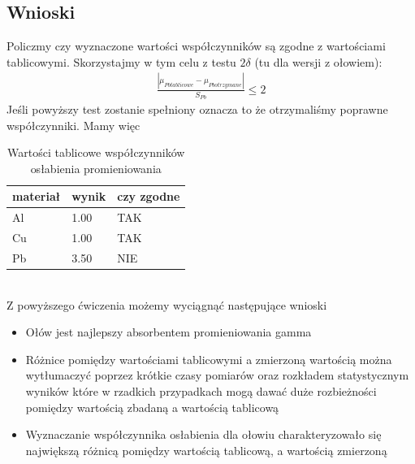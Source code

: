 \documentclass[a4paper]{article}
\newlength{\du}
\begin{document}
\subsection{Wnioski}
Policzmy czy wyznaczone wartości współczynników są zgodne z wartościami tablicowymi. Skorzystajmy w tym celu z testu $2\delta$ (tu dla wersji z ołowiem):
\begin{align*}
\frac{|\mu_{Pb tablicowe} - \mu_{Pb otrzymane}|}{S_{Pb}} \leq 2
\end{align*}
Jeśli powyższy test zostanie spełniony oznacza to że otrzymaliśmy poprawne współczynniki.
Mamy więc \\
\begin{table}[h!]
\centering
\begin{tabular}{ | l | l | l | }
\hline
materiał & wynik & czy zgodne \\ \hline
Al & 1.00 & TAK \\ \hline  
Cu & 1.00 & TAK \\ \hline  
Pb & 3.50 & NIE \\ \hline  
\end{tabular}
\caption{Wartości tablicowe współczynników osłabienia promieniowania}
\label{pomiary_sruba}
\end{table}\\
Z powyższego ćwiczenia możemy wyciągnąć następujące wnioski
\begin{itemize}
\item Ołów jest najlepszy absorbentem promieniowania gamma
\item Różnice pomiędzy wartościami tablicowymi a zmierzoną wartością można wytłumaczyć poprzez krótkie czasy pomiarów oraz rozkładem statystycznym wyników które w rzadkich przypadkach mogą dawać duże rozbieżności pomiędzy wartością zbadaną a wartością tablicową
\item Wyznaczanie współczynnika osłabienia dla ołowiu charakteryzowało się największą różnicą pomiędzy wartością tablicową, a wartością zmierzoną
\end{itemize}
\end{document}
